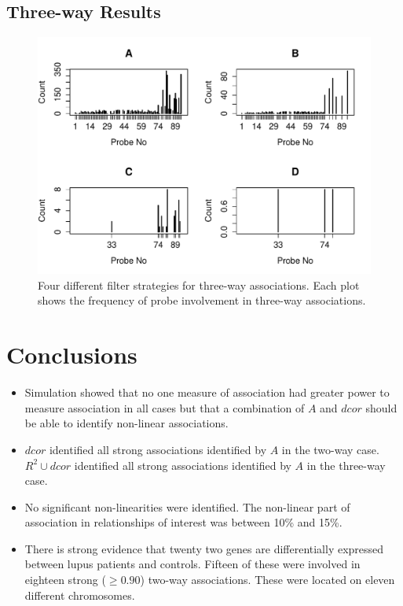 \documentclass[a4paper, landscape, 20pt]{extreport}
\begin{document}
\subsection*{\color{Blue} Three-way Results}

\begin{figure}[H]
	\begin{center}
		\includegraphics[width=12cm]{3wayFilter}
\caption{Four different filter strategies for three-way associations. Each plot shows the frequency of probe involvement in three-way associations.}
	\end{center}
\end{figure}

\newpage
\section*{\color{Blue} Conclusions}

\begin{itemize}
\item Simulation showed that no one measure of association had greater power to measure association in all cases but that a combination of $A$ and $dcor$ should be able to identify non-linear associations.


\item $dcor$ identified all strong associations identified by $A$ in the two-way case. $R^2 \cup dcor$  identified all strong associations identified by $A$ in the three-way case. 

\item No significant non-linearities were identified. The non-linear part of association in relationships of interest was between 10\% and 15\%.

\item There is strong evidence that twenty two genes are differentially expressed between lupus patients and controls. Fifteen of these were involved in eighteen strong ($\ge 0.90$) two-way associations. These were located on eleven different chromosomes.
\end{itemize}
\end{document}

